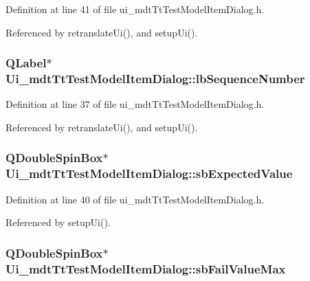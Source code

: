 Definition at line 41 of file ui\-\_\-mdt\-Tt\-Test\-Model\-Item\-Dialog.\-h.



Referenced by retranslate\-Ui(), and setup\-Ui().

\hypertarget{class_ui__mdt_tt_test_model_item_dialog_abea0311fd80b2e6656ee652cfe936634}{
\subsubsection[{lb\-Sequence\-Number}]{\setlength{\rightskip}{0pt plus 5cm}Q\-Label$\ast$ Ui\-\_\-mdt\-Tt\-Test\-Model\-Item\-Dialog\-::lb\-Sequence\-Number}}\label{class_ui__mdt_tt_test_model_item_dialog_abea0311fd80b2e6656ee652cfe936634}


Definition at line 37 of file ui\-\_\-mdt\-Tt\-Test\-Model\-Item\-Dialog.\-h.



Referenced by retranslate\-Ui(), and setup\-Ui().

\hypertarget{class_ui__mdt_tt_test_model_item_dialog_a1f36ff5ef9cdce71515249b61db66c4a}{
\subsubsection[{sb\-Expected\-Value}]{\setlength{\rightskip}{0pt plus 5cm}Q\-Double\-Spin\-Box$\ast$ Ui\-\_\-mdt\-Tt\-Test\-Model\-Item\-Dialog\-::sb\-Expected\-Value}}\label{class_ui__mdt_tt_test_model_item_dialog_a1f36ff5ef9cdce71515249b61db66c4a}


Definition at line 40 of file ui\-\_\-mdt\-Tt\-Test\-Model\-Item\-Dialog.\-h.



Referenced by setup\-Ui().

\hypertarget{class_ui__mdt_tt_test_model_item_dialog_a285957e452d01cd6a0a81f5d4a0c58e7}{
\subsubsection[{sb\-Fail\-Value\-Max}]{\setlength{\rightskip}{0pt plus 5cm}Q\-Double\-Spin\-Box$\ast$ Ui\-\_\-mdt\-Tt\-Test\-Model\-Item\-Dialog\-::sb\-Fail\-Value\-Max}}\label{class_ui__mdt_tt_test_model_item_dialog_a285957e452d01cd6a0a81f5d4a0c58e7}


